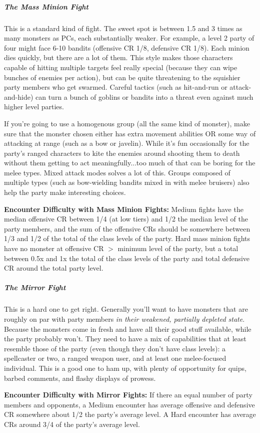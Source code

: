 \documentclass[10pt,twoside,openany,bg=none]{dndbook}
\begin{document}
\subparagraph*{The Mass Minion Fight}
This is a standard kind of fight. The sweet spot is between 1.5 and 3 times as many monsters as PCs, each substantially weaker. For example, a level 2 party of four might face 6-10 bandits (offensive CR 1/8, defensive CR 1/8). Each minion dies quickly, but there are a lot of them. This style makes those characters capable of hitting multiple targets feel really special (because they can wipe bunches of enemies per action), but can be quite threatening to the squishier party members who get swarmed. Careful tactics (such as hit-and-run or attack-and-hide) can turn a bunch of goblins or bandits into a threat even against much higher level parties.

If you're going to use a homogenous group (all the same kind of monster), make sure that the monster chosen either has extra movement abilities OR some way of attacking at range (such as a bow or javelin). While it's fun occasionally for the party's ranged characters to kite the enemies around shooting them to death without them getting to act meaningfully...too much of that can be boring for the melee types. Mixed attack modes solves a lot of this. Groups composed of multiple types (such as bow-wielding bandits mixed in with melee bruisers) also help the party make interesting choices.

\textbf{Encounter Difficulty with Mass Minion Fights:} Medium fights have the median offensive CR between 1/4 (at low tiers) and 1/2 the median level of the party members, and the sum of the offensive CRs should be somewhere between 1/3 and 1/2 of the total of the class levels of the party. Hard mass minion fights have no monster at offensive CR $>$ minimum level of the party, but a total between 0.5x and 1x the total of the class levels of the party and total defensive CR around the total party level.

\subparagraph*{The Mirror Fight} This is a hard one to get right. Generally you'll want to have monsters that are roughly on par with party members \textit{in their weakened, partially depleted state}. Because the monsters come in fresh and have all their good stuff available, while the party probably won't. They need to have a mix of capabilities that at least resemble those of the party (even though they don't have class levels): a spellcaster or two, a ranged weapon user, and at least one melee-focused individual. This is a good one to ham up, with plenty of opportunity for quips, barbed comments, and flashy displays of prowess.

\textbf{Encounter Difficulty with Mirror Fights:} If there an equal number of party members and opponents, a Medium encounter has average offensive and defensive CR somewhere about 1/2 the party's average level. A Hard encounter has average CRs around 3/4 of the party's average level.
\end{document}
